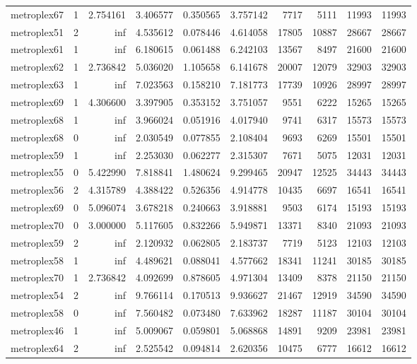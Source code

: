 \begin{longtable}{|l|r|r|r|r|r|r|r|r|r|}
metroplex67 & 1 & 2.754161 & 3.406577 & 0.350565 & 3.757142 & 7717 & 5111 & 11993 & 11993 \\
metroplex51 & 2 & inf & 4.535612 & 0.078446 & 4.614058 & 17805 & 10887 & 28667 & 28667 \\
metroplex61 & 1 & inf & 6.180615 & 0.061488 & 6.242103 & 13567 & 8497 & 21600 & 21600 \\
metroplex62 & 1 & 2.736842 & 5.036020 & 1.105658 & 6.141678 & 20007 & 12079 & 32903 & 32903 \\
metroplex63 & 1 & inf & 7.023563 & 0.158210 & 7.181773 & 17739 & 10926 & 28997 & 28997 \\
metroplex69 & 1 & 4.306600 & 3.397905 & 0.353152 & 3.751057 & 9551 & 6222 & 15265 & 15265 \\
metroplex68 & 1 & inf & 3.966024 & 0.051916 & 4.017940 & 9741 & 6317 & 15573 & 15573 \\
metroplex68 & 0 & inf & 2.030549 & 0.077855 & 2.108404 & 9693 & 6269 & 15501 & 15501 \\
metroplex59 & 1 & inf & 2.253030 & 0.062277 & 2.315307 & 7671 & 5075 & 12031 & 12031 \\
metroplex55 & 0 & 5.422990 & 7.818841 & 1.480624 & 9.299465 & 20947 & 12525 & 34443 & 34443 \\
metroplex56 & 2 & 4.315789 & 4.388422 & 0.526356 & 4.914778 & 10435 & 6697 & 16541 & 16541 \\
metroplex69 & 0 & 5.096074 & 3.678218 & 0.240663 & 3.918881 & 9503 & 6174 & 15193 & 15193 \\
metroplex70 & 0 & 3.000000 & 5.117605 & 0.832266 & 5.949871 & 13371 & 8340 & 21093 & 21093 \\
metroplex59 & 2 & inf & 2.120932 & 0.062805 & 2.183737 & 7719 & 5123 & 12103 & 12103 \\
metroplex58 & 1 & inf & 4.489621 & 0.088041 & 4.577662 & 18341 & 11241 & 30185 & 30185 \\
metroplex70 & 1 & 2.736842 & 4.092699 & 0.878605 & 4.971304 & 13409 & 8378 & 21150 & 21150 \\
metroplex54 & 2 & inf & 9.766114 & 0.170513 & 9.936627 & 21467 & 12919 & 34590 & 34590 \\
metroplex58 & 0 & inf & 7.560482 & 0.073480 & 7.633962 & 18287 & 11187 & 30104 & 30104 \\
metroplex46 & 1 & inf & 5.009067 & 0.059801 & 5.068868 & 14891 & 9209 & 23981 & 23981 \\
metroplex64 & 2 & inf & 2.525542 & 0.094814 & 2.620356 & 10475 & 6777 & 16612 & 16612 \\

\end{longtable}
